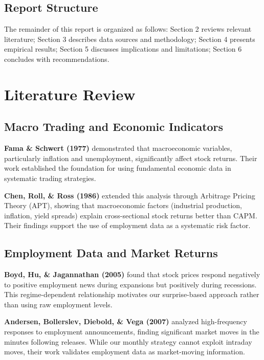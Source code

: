 \documentclass[12pt,a4paper]{article}
\begin{document}
\subsection{Report Structure}

The remainder of this report is organized as follows: Section 2 reviews relevant literature; Section 3 describes data sources and methodology; Section 4 presents empirical results; Section 5 discusses implications and limitations; Section 6 concludes with recommendations.

\newpage
\section{Literature Review}

\subsection{Macro Trading and Economic Indicators}

\textbf{Fama \& Schwert (1977)} demonstrated that macroeconomic variables, particularly inflation and unemployment, significantly affect stock returns. Their work established the foundation for using fundamental economic data in systematic trading strategies.

\textbf{Chen, Roll, \& Ross (1986)} extended this analysis through Arbitrage Pricing Theory (APT), showing that macroeconomic factors (industrial production, inflation, yield spreads) explain cross-sectional stock returns better than CAPM. Their findings support the use of employment data as a systematic risk factor.

\subsection{Employment Data and Market Returns}

\textbf{Boyd, Hu, \& Jagannathan (2005)} found that stock prices respond negatively to positive employment news during expansions but positively during recessions. This regime-dependent relationship motivates our surprise-based approach rather than using raw employment levels.

\textbf{Andersen, Bollerslev, Diebold, \& Vega (2007)} analyzed high-frequency responses to employment announcements, finding significant market moves in the minutes following releases. While our monthly strategy cannot exploit intraday moves, their work validates employment data as market-moving information.
\end{document}
